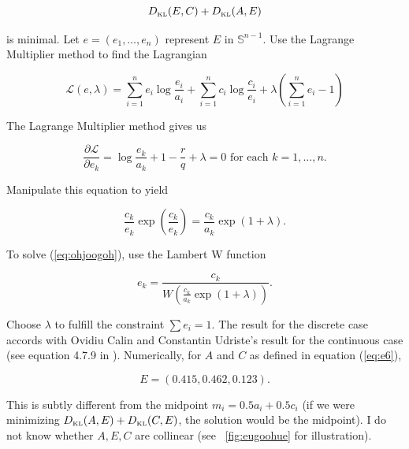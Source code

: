 \documentclass[phd,12pt,oneside]{ubcthesis}
\begin{document}
\begin{equation}
  \label{eq:eaghaidu}
D_{\mbox{\tiny KL}}(E,C)+D_{\mbox{\tiny KL}}(A,E)  
\end{equation}

{\noindent}is minimal. Let $e=(e_{1},\ldots,e_{n})$ represent $E$ in
$\mathbb{S}^{n-1}$. Use the Lagrange Multiplier method to find the
Lagrangian

\begin{equation}
  \label{eq:eiweehee}
  \mathcal{L}(e,\lambda)=\sum_{i=1}^{n}e_{i}\log\frac{e_{i}}{a_{i}}+\sum_{i=1}^{n}c_{i}\log\frac{c_{i}}{e_{i}}+\lambda\left(\sum_{i=1}^{n}e_{i}-1\right)
\end{equation}

{\noindent}The Lagrange Multiplier method gives us

\begin{equation}
  \label{eq:nainguji}
  \frac{\partial\mathcal{L}}{\partial{}e_{k}}=\log\frac{e_{k}}{a_{k}}+1-\frac{r}{q}+\lambda=0\mbox{ for each }k=1,{\ldots},n.
\end{equation}

{\noindent}Manipulate this equation to yield

\begin{equation}
  \label{eq:ohjoogoh}
  \frac{c_{k}}{e_{k}}\exp\left(\frac{c_{k}}{e_{k}}\right)=\frac{c_{k}}{a_{k}}\exp(1+\lambda).
\end{equation}

{\noindent}To solve (\ref{eq:ohjoogoh}), use the Lambert W function

\begin{equation}
  \label{eq:ouquuzoh}
  e_{k}=\frac{c_{k}}{W\left(\frac{c_{k}}{a_{k}}\exp(1+\lambda)\right)}.
\end{equation}

{\noindent}Choose $\lambda$ to fulfill the constraint $\sum{}e_{i}=1$. The
result for the discrete case accords with Ovidiu Calin and Constantin
Udriste's result for the continuous case (see equation 4.7.9 in
). Numerically, for $A$ and $C$ as
defined in equation (\ref{eq:e6}),

\begin{equation}
  \label{eq:aemaujei}
  E=(0.415,0.462,0.123).
\end{equation}

{\noindent}This is subtly different from the midpoint $m_{i}=0.5a_{i}+0.5c_{i}$
(if we were minimizing
$D_{\mbox{\tiny KL}}(A,E)+D_{\mbox{\tiny KL}}(C,E)$, the solution
would be the midpoint). I do not know whether $A,E,C$ are collinear
(see {\igure}~\ref{fig:eugoohue} for illustration).
\end{document}
